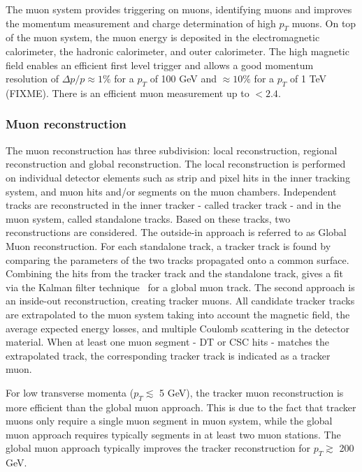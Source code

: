 The muon system provides triggering on muons, identifying muons and improves the momentum measurement and charge determination of high $p_T$ muons. On top of the muon system, the muon energy is deposited in the electromagnetic calorimeter, the hadronic calorimeter, and outer calorimeter. 
The high magnetic field enables an efficient first level trigger and allows a good momentum resolution of $\Delta p / p \approx 1\%$ for a $p_T$ of 100 \si{ \GeV} and $\approx 10\%$ for a $p_T$ of 1 \si{ \TeV} (FIXME). There is an efficient muon measurement up to \abspsrap $<2.4$.
\subsubsection*{Muon reconstruction}
 The muon reconstruction\cite{Chatrchyan:2012xi} has three subdivision: local reconstruction, regional reconstruction and global reconstruction. 
The local reconstruction is performed on individual detector elements such as strip and pixel hits in the inner tracking system, and muon hits and/or segments on the muon chambers. Independent tracks are reconstructed in the inner tracker - called tracker track -  and in the muon system, called standalone tracks.
Based on these tracks, two reconstructions are considered.
The outside-in approach is referred to as Global Muon reconstruction. 
 For each standalone track, a tracker track is found by comparing the parameters of the two tracks propagated onto a common surface. Combining the hits from the tracker track and the standalone track, gives a fit via the Kalman filter technique~\cite{FRUHWIRTH1987444,Billoir:1989mh} for a global muon track. 
 The second approach is an inside-out reconstruction, creating tracker muons. 
 All candidate tracker tracks are extrapolated to the muon system taking into account the magnetic field, the average expected energy losses, and multiple Coulomb scattering in the detector material. When at least one muon segment - DT or CSC hits -  matches the extrapolated track, the corresponding tracker track is indicated as a tracker muon. 
 
 For low transverse momenta ($p_T \lesssim$ 5 \si{ \GeV}), the tracker muon reconstruction is  more efficient than the global muon approach. This is due to the fact that tracker muons only require a single muon  segment in muon system, while the global muon approach requires typically segments in at least two muon stations. The global muon approach typically improves the tracker reconstruction for $p_T\gtrsim$ 200 \si{ \GeV}.
 

